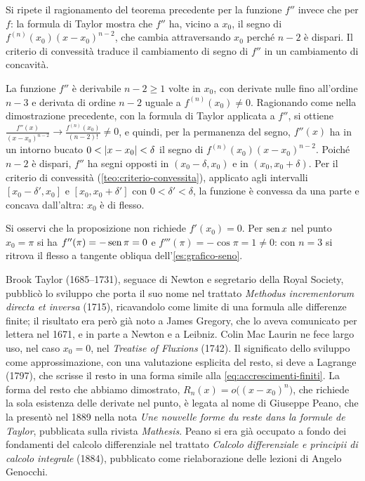 \begin{strategia}
Si ripete il ragionamento del teorema precedente per la funzione $f''$ invece che per
$f$: la formula di Taylor mostra che $f''$ ha, vicino a $x_{0}$, il segno di
$f^{(n)}(x_{0})(x-x_{0})^{n-2}$, che cambia attraversando $x_{0}$ perché $n-2$ è dispari.
Il criterio di convessità traduce il cambiamento di segno di $f''$ in un cambiamento di
concavità.
\end{strategia}

\begin{dimostrazione}
La funzione $f''$ è derivabile $n-2\ge1$ volte in $x_{0}$, con derivate nulle fino
all'ordine $n-3$ e derivata di ordine $n-2$ uguale a $f^{(n)}(x_{0})\neq0$. Ragionando
come nella dimostrazione precedente, con la formula di Taylor applicata a $f''$, si
ottiene $\frac{f''(x)}{(x-x_{0})^{n-2}}\to\frac{f^{(n)}(x_{0})}{(n-2)!}\neq0$, e quindi, per
la permanenza del segno, $f''(x)$ ha in un intorno bucato $0<\lvert x-x_{0}\rvert<\delta$ il
segno di $f^{(n)}(x_{0})(x-x_{0})^{n-2}$. Poiché $n-2$ è dispari, $f''$ ha segni opposti
in $(x_{0}-\delta,x_{0})$ e in $(x_{0},x_{0}+\delta)$. Per il criterio di convessità
(\cref{teo:criterio-convessita}), applicato agli intervalli $[x_{0}-\delta',x_{0}]$ e
$[x_{0},x_{0}+\delta']$ con $0<\delta'<\delta$, la funzione è convessa da una parte e
concava dall'altra: $x_{0}$ è di flesso.
\end{dimostrazione}

Si osservi che la proposizione non richiede $f'(x_{0})=0$. Per $\operatorname{sen} x$ nel punto
$x_{0}=\pi$ si ha $f''(\pi)=-\operatorname{sen}\pi=0$ e $f'''(\pi)=-\cos\pi=1\neq0$: con $n=3$ si
ritrova il flesso a tangente obliqua dell'\cref{es:grafico-seno}.

\begin{notastorica}
Brook Taylor (1685--1731), seguace di Newton e segretario della Royal Society, pubblicò
lo sviluppo che porta il suo nome nel trattato \emph{Methodus incrementorum directa et
inversa} (1715), ricavandolo come limite di una formula alle differenze finite; il
risultato era però già noto a James Gregory, che lo aveva comunicato per lettera nel
1671, e in parte a Newton e a Leibniz. Colin Mac Laurin ne fece largo uso, nel caso
$x_{0}=0$, nel \emph{Treatise of Fluxions} (1742). Il significato dello sviluppo come
approssimazione, con una valutazione esplicita del resto, si deve a Lagrange (1797), che
scrisse il resto in una forma simile alla \eqref{eq:accrescimenti-finiti}. La forma del
resto che abbiamo dimostrato, $R_{n}(x)=o\bigl((x-x_{0})^{n}\bigr)$, che richiede la sola
esistenza delle derivate nel punto, è legata al nome di Giuseppe Peano, che la presentò
nel 1889 nella nota \emph{Une nouvelle forme du reste dans la formule de Taylor},
pubblicata sulla rivista \emph{Mathesis}. Peano si era già occupato a fondo dei
fondamenti del calcolo differenziale nel trattato \emph{Calcolo differenziale e principii
di calcolo integrale} (1884), pubblicato come rielaborazione delle lezioni di Angelo
Genocchi.
\end{notastorica}
